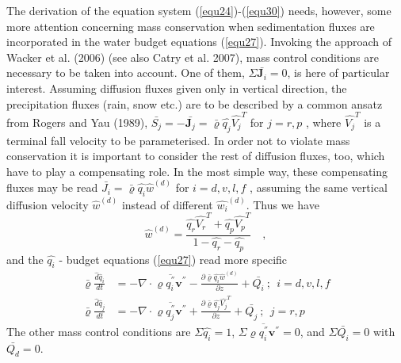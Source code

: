 The derivation of the equation system (\ref{equ24})-(\ref{equ30}) needs, however, some more attention concerning mass conservation when sedimentation fluxes are incorporated in the water budget equations (\ref{equ27}). Invoking the approach of Wacker et al. (2006) (see also Catry et al. 2007), mass control conditions are necessary to be taken into account. One of them, $\Sigma \bar{\mathbf{J}_i} = 0$, is here of particular interest. Assuming diffusion fluxes given only in vertical direction, the precipitation fluxes (rain, snow etc.) are to be described by a common ansatz from Rogers and Yau (1989), $\bar{S_j}=-\bar{\mathbf{J}_j}=\bar{\varrho}\hat{q_j}\hat{V_j}^T$ for $j=r,p$ , where $\hat{V_j}^T$ is a terminal fall velocity to be parameterised. In order not to violate mass conservation it is important to consider the rest of diffusion fluxes, too, which have to play a compensating role. In the most simple way, these compensating fluxes may be read $\bar{J_i}=\bar{\varrho}\hat{q_i}\hat{w}^{(d)}$ for $i=d,v,l,f$ , assuming the same vertical diffusion velocity $\hat{w}^{(d)}$ instead of different $\hat{w_i}^{(d)}$. Thus we have
\begin{displaymath}
\hat{w}^{(d)} = \frac{\hat{q_r} \hat{V_r}^T+\hat{q_p} \hat{V_p}^T}{1 - \hat{q_r} - \hat{q_p}} \quad ,\label{equ31}
\end{displaymath}
and the $\hat{q_i}$ - budget equations (\ref{equ27}) read more specific
\begin{align}
\bar{\varrho}\frac{\hat{d}\hat{q}_{i}}{dt}&=
-\nabla\cdot \overline{\varrho q_{i}^{''}\mathbf{v}^{''}} - \frac{\partial\bar{\varrho}\hat{q_i}\hat{w}^{(d)}}{\partial z} + \bar{Q_{i}} \:;\:\:  i=d,v,l,f  \nonumber\\
\bar{\varrho}\frac{\hat{d}\hat{q}_{j}}{dt}&=
-\nabla\cdot \overline{\varrho q_{j}^{''}\mathbf{v}^{''}} + \frac{\partial\bar{\varrho}\hat{q_j}\hat{V_j}^T}{\partial z} + \bar{Q_{j}} \:;\:\:
 j=r, p \nonumber
\end{align}
The other mass control conditions are $\Sigma \hat{q_i} = 1$, $\Sigma \overline{\varrho q_{i}^{''}\mathbf{v}^{''}} = 0$, and $\Sigma \bar{Q_{i}} = 0$ with $\bar{Q_{d}}= 0$. 

